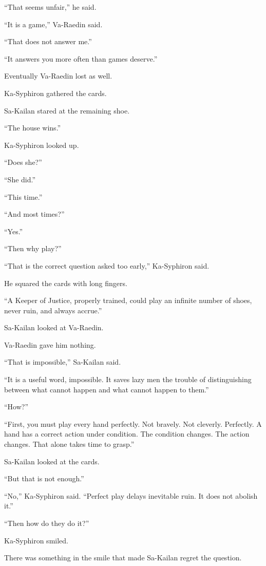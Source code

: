 “That seems unfair,” he said.\par
“It is a game,” Va-Raedin said.\par
“That does not answer me.”\par
“It answers you more often than games deserve.”\par
Eventually Va-Raedin lost as well.\par
Ka-Syphiron gathered the cards.\par
Sa-Kailan stared at the remaining shoe.\par
“The house wins.”\par
Ka-Syphiron looked up.\par
“Does she?”\par
“She did.”\par
“This time.”\par
“And most times?”\par
“Yes.”\par
“Then why play?”\par
“That is the correct question asked too early,” Ka-Syphiron said.\par
He squared the cards with long fingers.\par
“A Keeper of Justice, properly trained, could play an infinite number of shoes, never ruin, and always accrue.”\par
Sa-Kailan looked at Va-Raedin.\par
Va-Raedin gave him nothing.\par
“That is impossible,” Sa-Kailan said.\par
“It is a useful word, impossible. It saves lazy men the trouble of distinguishing between what cannot happen and what cannot happen to them.”\par
“How?”\par
“First, you must play every hand perfectly. Not bravely. Not cleverly. Perfectly. A hand has a correct action under condition. The condition changes. The action changes. That alone takes time to grasp.”\par
Sa-Kailan looked at the cards.\par
“But that is not enough.”\par
“No,” Ka-Syphiron said. “Perfect play delays inevitable ruin. It does not abolish it.”\par
“Then how do they do it?”\par
Ka-Syphiron smiled.\par
There was something in the smile that made Sa-Kailan regret the question.\par
